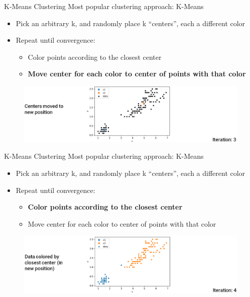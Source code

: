 \documentclass[aspectratio=169]{../latex_main/tntbeamer}  %
\begin{document}
	
	
	\begin{frame}{K-Means Clustering}
	    Most popular clustering approach: K-Means
	    \begin{itemize}
	        \item Pick an arbitrary k, and randomly place k “centers”, each a different color
	        \item Repeat until convergence:
	        \begin{itemize}
	            \item Color points according to the closest center
	            \item \textbf{Move center for each color to center of points with that color}
	        \end{itemize}
	    \end{itemize}
	    \begin{figure}
	        \centering
	        \includegraphics[scale=.39]{Bild15}
	    \end{figure}
	\end{frame}
	
	
	\begin{frame}{K-Means Clustering}
	    Most popular clustering approach: K-Means
	    \begin{itemize}
	        \item Pick an arbitrary k, and randomly place k “centers”, each a different color
	        \item Repeat until convergence:
	        \begin{itemize}
	            \item \textbf{Color points according to the closest center}
	            \item Move center for each color to center of points with that color
	        \end{itemize}
	    \end{itemize}
	    \begin{figure}
	        \centering
	        \includegraphics[scale=.38]{Bild16}
	    \end{figure}
	\end{frame}
	
\end{document}
